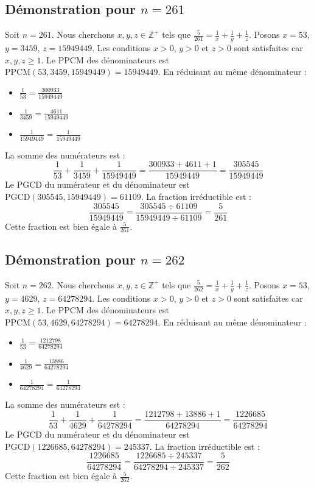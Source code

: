 \documentclass[11pt,a4paper]{article}
\begin{document}
\subsection{Démonstration pour $n = 261$}
Soit $n = 261$. Nous cherchons $x, y, z \in \mathbb{Z}^{+}$ tels que $\frac{5}{261} = \frac{1}{x} + \frac{1}{y} + \frac{1}{z}$.
Posons $x = 53$, $y = 3459$, $z = 15949449$.
Les conditions $x > 0$, $y > 0$ et $z > 0$ sont satisfaites car $x, y, z \geq 1$.
Le PPCM des dénominateurs est $\text{PPCM}(53, 3459, 15949449) = 15949449$.
En réduisant au même dénominateur :
\begin{itemize}
    \item $\frac{1}{53} = \frac{300933}{15949449}$
    \item $\frac{1}{3459} = \frac{4611}{15949449}$
    \item $\frac{1}{15949449} = \frac{1}{15949449}$
\end{itemize}
La somme des numérateurs est :
$$ \frac{1}{53} + \frac{1}{3459} + \frac{1}{15949449} = \frac{300933 + 4611 + 1}{15949449} = \frac{305545}{15949449} $$
Le PGCD du numérateur et du dénominateur est $\text{PGCD}(305545, 15949449) = 61109$.
La fraction irréductible est :
$$ \frac{305545}{15949449} = \frac{305545 \div 61109}{15949449 \div 61109} = \frac{5}{261} $$
Cette fraction est bien égale à $\frac{5}{261}$.

\subsection{Démonstration pour $n = 262$}
Soit $n = 262$. Nous cherchons $x, y, z \in \mathbb{Z}^{+}$ tels que $\frac{5}{262} = \frac{1}{x} + \frac{1}{y} + \frac{1}{z}$.
Posons $x = 53$, $y = 4629$, $z = 64278294$.
Les conditions $x > 0$, $y > 0$ et $z > 0$ sont satisfaites car $x, y, z \geq 1$.
Le PPCM des dénominateurs est $\text{PPCM}(53, 4629, 64278294) = 64278294$.
En réduisant au même dénominateur :
\begin{itemize}
    \item $\frac{1}{53} = \frac{1212798}{64278294}$
    \item $\frac{1}{4629} = \frac{13886}{64278294}$
    \item $\frac{1}{64278294} = \frac{1}{64278294}$
\end{itemize}
La somme des numérateurs est :
$$ \frac{1}{53} + \frac{1}{4629} + \frac{1}{64278294} = \frac{1212798 + 13886 + 1}{64278294} = \frac{1226685}{64278294} $$
Le PGCD du numérateur et du dénominateur est $\text{PGCD}(1226685, 64278294) = 245337$.
La fraction irréductible est :
$$ \frac{1226685}{64278294} = \frac{1226685 \div 245337}{64278294 \div 245337} = \frac{5}{262} $$
Cette fraction est bien égale à $\frac{5}{262}$.
\end{document}
